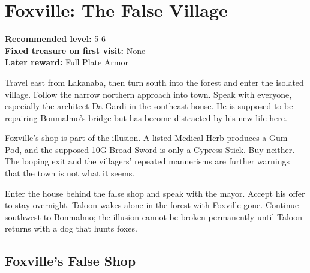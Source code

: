 \documentclass[
  american,
  10pt,
  letterpaper,
  oneside,
  open=any]{scrreprt}
\begin{document}
\section{Foxville: The False Village}\label{foxville-the-false-village}

\textbf{Recommended level:} 5-6\\
\textbf{Fixed treasure on first visit:} None\\
\textbf{Later reward:} Full Plate Armor

Travel east from Lakanaba, then turn south into the forest and enter the
isolated village. Follow the narrow northern approach into town. Speak
with everyone, especially the architect Da Gardi in the southeast house.
He is supposed to be repairing Bonmalmo's bridge but has become
distracted by his new life here.

Foxville's shop is part of the illusion. A listed Medical Herb produces
a Gum Pod, and the supposed 10G Broad Sword is only a Cypress Stick. Buy
neither. The looping exit and the villagers' repeated mannerisms are
further warnings that the town is not what it seems.

Enter the house behind the false shop and speak with the mayor. Accept
his offer to stay overnight. Taloon wakes alone in the forest with
Foxville gone. Continue southwest to Bonmalmo; the illusion cannot be
broken permanently until Taloon returns with a dog that hunts foxes.

\subsection{Foxville's False Shop}\label{foxvilles-false-shop}
\end{document}

